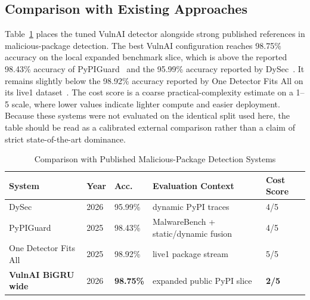 \documentclass[conference]{IEEEtran}
\begin{document}
\subsection{Comparison with Existing Approaches}
Table~\ref{tab:published_compare} places the tuned VulnAI detector alongside strong published references in malicious-package detection. The best VulnAI configuration reaches 98.75\% accuracy on the local expanded benchmark slice, which is above the reported 98.43\% accuracy of PyPIGuard~\cite{iqbal2025pypiguard} and the 95.99\% accuracy reported by DySec~\cite{mehedi2026dysec}. It remains slightly below the 98.92\% accuracy reported by One Detector Fits All on its live1 dataset~\cite{montaruli2025onedetector}. The cost score is a coarse practical-complexity estimate on a 1--5 scale, where lower values indicate lighter compute and easier deployment. Because these systems were not evaluated on the identical split used here, the table should be read as a calibrated external comparison rather than a claim of strict state-of-the-art dominance.

\begin{table}[htbp]
\caption{Comparison with Published Malicious-Package Detection Systems}
\label{tab:published_compare}
\centering
\renewcommand{\arraystretch}{1.2}
\begin{tabular}{p{1.95cm}p{0.8cm}p{0.95cm}p{1.65cm}p{0.95cm}}
\toprule
\textbf{System} & \textbf{Year} & \textbf{Acc.} & \textbf{Evaluation Context} & \textbf{Cost Score} \\
\midrule
DySec~\cite{mehedi2026dysec} & 2026 & 95.99\% & dynamic PyPI traces & 4/5 \\
PyPIGuard~\cite{iqbal2025pypiguard} & 2025 & 98.43\% & MalwareBench + static/dynamic fusion & 4/5 \\
One Detector Fits All~\cite{montaruli2025onedetector} & 2025 & 98.92\% & live1 package stream & 5/5 \\
\textbf{VulnAI BiGRU wide} & 2026 & \textbf{98.75\%} & expanded public PyPI slice & \textbf{2/5} \\
\bottomrule
\end{tabular}
\end{table}
\end{document}
